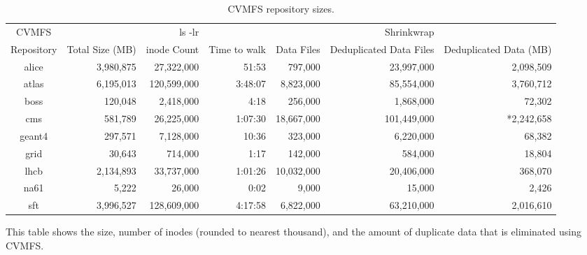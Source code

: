 \documentclass[sigconf]{acmart}
\begin{document}
\begin{table}[t]
\begin{center}
\begin{tabular}{|c|r r r|r r r|}
\hline
CVMFS & & ls -lr & & & Shrinkwrap & \\
Repository & Total Size (MB) & inode Count & Time to walk & 
  Data Files & Deduplicated Data Files & Deduplicated Data (MB) \\ \hline
alice & 3,980,875 & 27,322,000 & 51:53 & 
  797,000 & 23,997,000 & 2,098,509\\
atlas & 6,195,013 & 120,599,000 & 3:48:07 &
 8,823,000 & 85,554,000 & 3,760,712 \\
boss & 120,048 & 2,418,000 & 4:18 &
 256,000 & 1,868,000 & 72,302\\
cms & 581,789 & 26,225,000 & 1:07:30 &
 18,667,000 & 101,449,000 & *2,242,658\\
geant4 & 297,571 & 7,128,000 & 10:36 &
 323,000 & 6,220,000 & 68,382 \\
grid & 30,643 & 714,000 & 1:17 &
 142,000 & 584,000 & 18,804 \\
lhcb & 2,134,893 & 33,737,000 & 1:01:26 &
 10,032,000 & 20,406,000 & 368,070 \\
na61 & 5,222 & 26,000 & 0:02 &
 9,000 & 15,000 & 2,426 \\
sft & 3,996,527 & 128,609,000 & 4:17:58 &
 6,822,000 & 63,210,000 & 2,016,610 \\ 
 \hline
\end{tabular}
\caption{CVMFS repository sizes.}
\label{tab:repo-sizes}
This table shows the size, number of inodes (rounded to nearest thousand), and the amount
of duplicate data that is eliminated using CVMFS.
\end{center}
\end{table}
\end{document}
